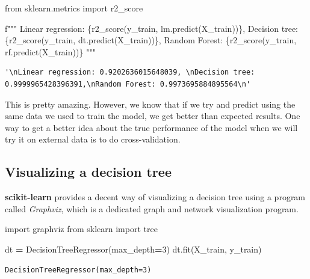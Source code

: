 \documentclass[
  letterpaper,
]{scrbook}
\newenvironment{Shaded}{\begin{snugshade}}{\end{snugshade}}
\newcommand{\DecValTok}[1]{\textcolor[rgb]{0.00,0.00,0.81}{#1}}
\newcommand{\ImportTok}[1]{#1}
\newcommand{\NormalTok}[1]{#1}
\newcommand{\OperatorTok}[1]{\textcolor[rgb]{0.81,0.36,0.00}{\textbf{#1}}}
\newcommand{\SpecialCharTok}[1]{\textcolor[rgb]{0.00,0.00,0.00}{#1}}
\newcommand{\SpecialStringTok}[1]{\textcolor[rgb]{0.31,0.60,0.02}{#1}}
\begin{document}
\begin{Shaded}
\begin{Highlighting}[]
\ImportTok{from}\NormalTok{ sklearn.metrics }\ImportTok{import}\NormalTok{  r2_score}

\SpecialStringTok{f"""}
\SpecialStringTok{Linear regression: }\SpecialCharTok{\{}\NormalTok{r2_score(y_train, lm.predict(X_train))}\SpecialCharTok{\}}\SpecialStringTok{, }
\SpecialStringTok{Decision tree: }\SpecialCharTok{\{}\NormalTok{r2_score(y_train, dt.predict(X_train))}\SpecialCharTok{\}}\SpecialStringTok{,}
\SpecialStringTok{Random Forest: }\SpecialCharTok{\{}\NormalTok{r2_score(y_train, rf.predict(X_train))}\SpecialCharTok{\}}
\SpecialStringTok{"""}
\end{Highlighting}
\end{Shaded}

\begin{verbatim}
'\nLinear regression: 0.9202636015648039, \nDecision tree: 0.9999965428396391,\nRandom Forest: 0.9973695884895564\n'
\end{verbatim}

This is pretty amazing. However, we know that if we try and predict using the same data we used to train
the model, we get better than expected results. One way to get a better idea about the true performance of the
model when we will try it on external data is to do cross-validation.

\hypertarget{visualizing-a-decision-tree}{%
\subsection{Visualizing a decision tree}\label{visualizing-a-decision-tree}}

\textbf{scikit-learn} provides a decent way of visualizing a decision tree using a program called \emph{Graphviz}, which is a dedicated graph and network visualization program.

\begin{Shaded}
\begin{Highlighting}[]
\ImportTok{import}\NormalTok{ graphviz}
\ImportTok{from}\NormalTok{ sklearn }\ImportTok{import}\NormalTok{ tree}

\NormalTok{dt }\OperatorTok{=}\NormalTok{ DecisionTreeRegressor(max_depth}\OperatorTok{=}\DecValTok{3}\NormalTok{)}
\NormalTok{dt.fit(X_train, y_train)}
\end{Highlighting}
\end{Shaded}

\begin{verbatim}
DecisionTreeRegressor(max_depth=3)
\end{verbatim}
\end{document}
